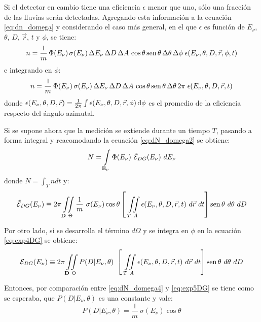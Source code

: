 	Si el detector en cambio tiene una eficiencia $\epsilon$ menor que uno, sólo una fracción de las lluvias serán detectadas. Agregando esta informaci\'on a la ecuaci\'on \ref{eq:dn_domega} y considerando el caso más general, en el que $\epsilon$ es función de $E_{\nu}$, $\theta$, $D$, $\vec{r}$, $t$ y $\phi$, se tiene:
	\begin{equation}
	n = \frac{1}{m}\,\Phi(E_{\nu})\,\sigma(E_{\nu})\,\Delta E_{\nu}\,\Delta D\,\Delta A\,\cos\theta\operatorname{sen}\theta\,\Delta\theta\,\Delta\phi\;\epsilon(E_{\nu},\theta,D,\vec{r},\phi,t)
	\label{eq:dN_domega}
	\end{equation}
	e integrando en $\phi$:
	\begin{equation}
	n = \frac{1}{m}\,\Phi(E_{\nu})\,\sigma(E_{\nu})\,\Delta E_{\nu}\,\Delta D\,\Delta A\,\cos\theta\operatorname{sen}\theta\,\Delta\theta\,2\pi\;\epsilon(E_{\nu},\theta,D,\vec{r},t)
	\label{eq:dN_domega2}
	\end{equation}
	donde $\epsilon(E_{\nu},\theta,D,\vec{r}) = \frac{1}{2\pi}\int \epsilon(E_{\nu},\theta,D,\vec{r},\phi)\,{\rm d}\phi$ es el promedio de la eficiencia respecto del ángulo azimutal. 

	Si se supone ahora que la medici\'on se extiende durante un tiempo $T$, pasando a forma integral y reacomodando la ecuación \ref{eq:dN_domega2} se obtiene:
	\begin{equation}
	N = \int\limits_{\mathbf{E_\nu}}\Phi(E_{\nu})~
	\tilde{\cal E}_{DG}(E_{\nu})
	~dE_\nu
	\label{eq:dN_domega3}
	\end{equation}
	donde $N=\int_{T} n dt$ y:
	\begin{equation}
	\tilde{\cal E}_{DG}(E_{\nu})
	\equiv 2\pi\iint\limits_{\mathbf{D}~\Theta}\frac{1}{m}~\sigma(E_{\nu})\cos\theta
		\left[
			~\iint\limits_{T~A} \epsilon(E_{\nu},\theta,D,\vec{r},t)~d\vec{r}~dt
		\right]
		\operatorname{sen}\theta~d\theta~dD
	\label{eq:dN_domega4}
	\end{equation}
	
	Por otro lado, si se desarrolla el término $d\Omega$ y se integra en $\phi$ en la ecuación \ref{eq:exp4DG} se obtiene:
	\begin{equation}
	{\cal E}_{DG}(E_\nu)\equiv2\pi\iint\limits_{\mathbf{D}~\Theta}P(D|E_{\nu},\theta)~
	 \left[~
	 \iint\limits_{T~A}\epsilon(E_{\nu},\theta,D,\vec{r},t)~d\vec{r}~dt
	 \right]
	 \operatorname{sen}\theta~d\theta~dD
	\label{eq:exp5DG}
	\end{equation}
	
	Entonces, por comparación entre \ref{eq:dN_domega4} y \ref{eq:exp5DG} se tiene como se esperaba, que $P(D|E_{\nu},\theta)$ es una constante y vale:
	\begin{equation}
	 P(D|E_{\nu},\theta) = \frac{1}{m}~\sigma(E_{\nu})\cos\theta
	\end{equation}
	
